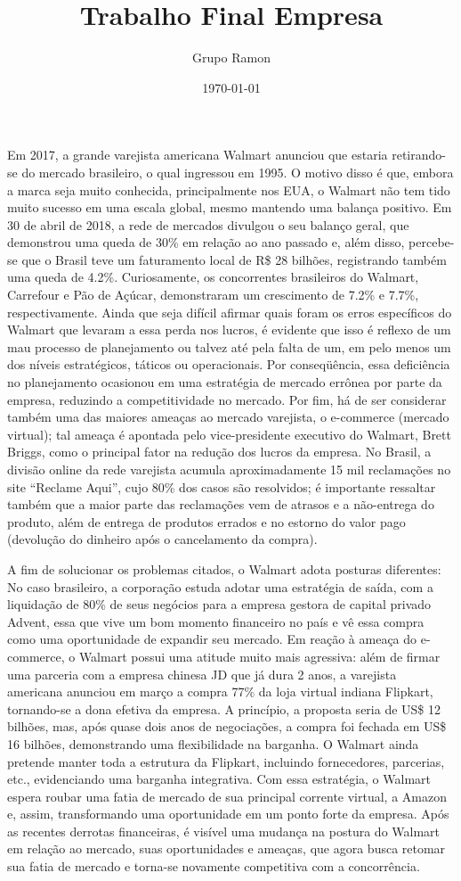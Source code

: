 \documentclass[12pt, a4paper]{article}
\title{Trabalho Final Empresa}
\author{Grupo Ramon}
\date{\today}
\begin{document}
\maketitle

Em 2017, a grande varejista americana Walmart anunciou que estaria retirando-se do mercado brasileiro, o qual ingressou em 1995. O motivo disso é que, embora a marca seja muito conhecida, principalmente nos EUA, o Walmart não tem tido muito sucesso em uma escala global, mesmo mantendo uma balança positivo. Em 30 de abril de 2018, a rede de mercados divulgou o seu balanço geral, que demonstrou uma queda de 30\% em relação ao ano passado e, além disso, percebe-se que o Brasil teve um faturamento local de R\$ 28 bilhões, registrando também uma queda de 4.2\%. Curiosamente, os concorrentes brasileiros do Walmart, Carrefour e Pão de Açúcar, demonstraram um crescimento de 7.2\% e 7.7\%, respectivamente.  Ainda que seja difícil afirmar quais foram os erros específicos do Walmart que levaram a essa perda nos lucros, é evidente que isso é reflexo de um mau processo de planejamento ou talvez até pela falta de um, em pelo menos um dos níveis estratégicos, táticos ou operacionais. Por conseqüência, essa deficiência no planejamento ocasionou em uma estratégia de mercado errônea por parte da empresa, reduzindo a competitividade no mercado. Por fim, há de ser considerar também uma das maiores ameaças ao mercado varejista, o e-commerce (mercado virtual); tal ameaça é apontada pelo vice-presidente executivo do Walmart, Brett Briggs, como o principal fator na redução dos lucros da empresa. No Brasil, a divisão online da rede varejista acumula aproximadamente 15 mil reclamações no site “Reclame Aqui”, cujo 80\% dos casos são resolvidos; é importante ressaltar também que a maior parte das reclamações vem de atrasos e a não-entrega do produto, além de entrega de produtos errados e no estorno do valor pago (devolução do dinheiro após o cancelamento da compra).

A fim de solucionar os problemas citados, o Walmart adota posturas diferentes: No caso brasileiro, a corporação estuda adotar uma estratégia de saída, com a liquidação de 80\% de seus negócios para a empresa gestora de capital privado Advent, essa que vive um bom momento financeiro no país e vê essa compra como uma oportunidade de expandir seu mercado. Em reação à ameaça do e-commerce, o Walmart possui uma atitude muito mais agressiva: além de firmar uma parceria com a empresa chinesa JD que já dura 2 anos, a varejista americana anunciou em março a compra 77\% da loja virtual indiana Flipkart, tornando-se a dona efetiva da empresa. A princípio, a proposta seria de US\$ 12 bilhões, mas, após quase dois anos de negociações, a compra foi fechada em US\$ 16 bilhões, demonstrando uma flexibilidade na barganha. O Walmart ainda pretende manter toda a estrutura da Flipkart, incluindo fornecedores, parcerias, etc., evidenciando uma barganha integrativa. Com essa estratégia, o Walmart espera roubar uma fatia de mercado de sua principal corrente virtual, a Amazon e, assim, transformando uma oportunidade em um ponto forte da empresa. Após as recentes derrotas financeiras, é visível uma mudança na postura do Walmart em relação ao mercado, suas oportunidades e ameaças, que agora busca retomar sua fatia de mercado e torna-se novamente competitiva com a concorrência.
\end{document}
